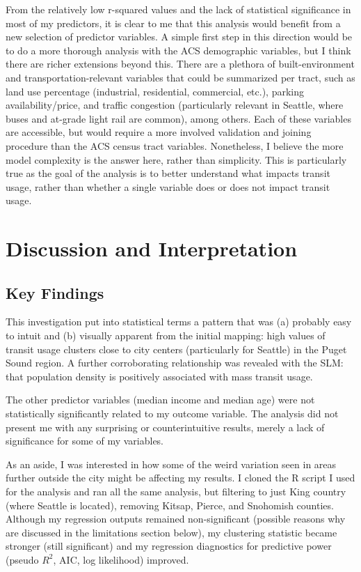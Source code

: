 \documentclass[
]{article}
\begin{document}
From the relatively low r-squared values and the lack of statistical
significance in most of my predictors, it is clear to me that this
analysis would benefit from a new selection of predictor variables. A
simple first step in this direction would be to do a more thorough
analysis with the ACS demographic variables, but I think there are
richer extensions beyond this. There are a plethora of built-environment
and transportation-relevant variables that could be summarized per
tract, such as land use percentage (industrial, residential, commercial,
etc.), parking availability/price, and traffic congestion (particularly
relevant in Seattle, where buses and at-grade light rail are common),
among others. Each of these variables are accessible, but would require
a more involved validation and joining procedure than the ACS census
tract variables. Nonetheless, I believe the more model complexity is the
answer here, rather than simplicity. This is particularly true as the
goal of the analysis is to better understand what impacts transit usage,
rather than whether a single variable does or does not impact transit
usage.

\section{Discussion and
Interpretation}\label{discussion-and-interpretation}

\subsection{Key Findings}\label{key-findings}

This investigation put into statistical terms a pattern that was (a)
probably easy to intuit and (b) visually apparent from the initial
mapping: high values of transit usage clusters close to city centers
(particularly for Seattle) in the Puget Sound region. A further
corroborating relationship was revealed with the SLM: that population
density is positively associated with mass transit usage.

The other predictor variables (median income and median age) were not
statistically significantly related to my outcome variable. The analysis
did not present me with any surprising or counterintuitive results,
merely a lack of significance for some of my variables.

As an aside, I was interested in how some of the weird variation seen in
areas further outside the city might be affecting my results. I cloned
the R script I used for the analysis and ran all the same analysis, but
filtering to just King country (where Seattle is located), removing
Kitsap, Pierce, and Snohomish counties. Although my regression outputs
remained non-significant (possible reasons why are discussed in the
limitations section below), my clustering statistic became stronger
(still significant) and my regression diagnostics for predictive power
(pseudo \(R^2\), AIC, log likelihood) improved.
\end{document}
